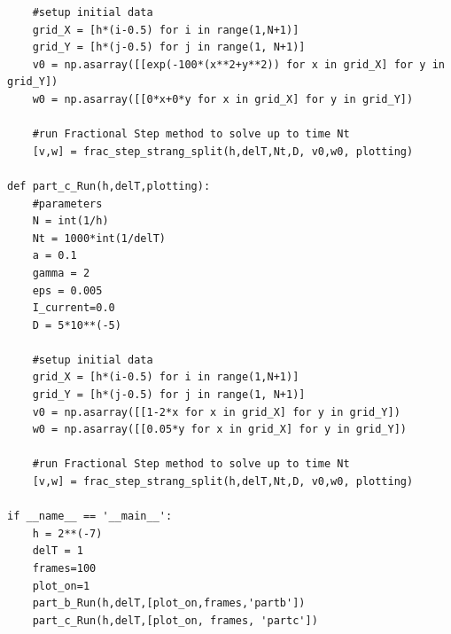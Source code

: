 \documentclass[12pt]{article}
\begin{document}
\begin{verbatim}
    #setup initial data
    grid_X = [h*(i-0.5) for i in range(1,N+1)]
    grid_Y = [h*(j-0.5) for j in range(1, N+1)]
    v0 = np.asarray([[exp(-100*(x**2+y**2)) for x in grid_X] for y in grid_Y])
    w0 = np.asarray([[0*x+0*y for x in grid_X] for y in grid_Y])
    
    #run Fractional Step method to solve up to time Nt
    [v,w] = frac_step_strang_split(h,delT,Nt,D, v0,w0, plotting)

def part_c_Run(h,delT,plotting):
    #parameters
    N = int(1/h)
    Nt = 1000*int(1/delT)
    a = 0.1
    gamma = 2
    eps = 0.005
    I_current=0.0
    D = 5*10**(-5)

    #setup initial data
    grid_X = [h*(i-0.5) for i in range(1,N+1)]
    grid_Y = [h*(j-0.5) for j in range(1, N+1)]
    v0 = np.asarray([[1-2*x for x in grid_X] for y in grid_Y])
    w0 = np.asarray([[0.05*y for x in grid_X] for y in grid_Y])
    
    #run Fractional Step method to solve up to time Nt
    [v,w] = frac_step_strang_split(h,delT,Nt,D, v0,w0, plotting)

if __name__ == '__main__':
    h = 2**(-7)
    delT = 1
    frames=100
    plot_on=1
    part_b_Run(h,delT,[plot_on,frames,'partb'])
    part_c_Run(h,delT,[plot_on, frames, 'partc'])  
\end{verbatim}
\end{document}
